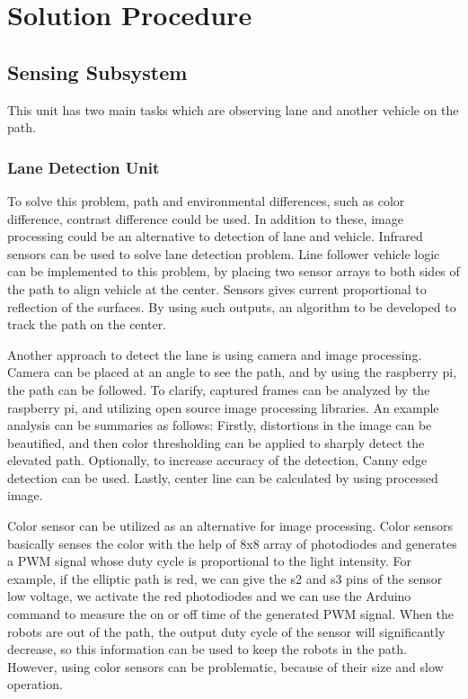 \documentclass[a4paper,12pt]{article}
\begin{document}
\section{Solution Procedure}
\subsection{Sensing Subsystem}
This unit has two main tasks which are observing lane and another vehicle on the path. 
\subsubsection{Lane Detection Unit}
To solve this problem, path and environmental differences, such as color difference, contrast difference could be used. In addition to these, image processing could be an alternative to detection of lane and vehicle. 
Infrared sensors can be used to solve lane detection problem. Line follower vehicle logic can be implemented to this problem, by placing two sensor arrays to both sides of the path to align vehicle at the center. Sensors gives current proportional to reflection of the surfaces. By using such outputs, an algorithm to be developed to track the path on the center. 

Another approach to detect the lane is using camera and image processing. Camera can be placed at an angle to see the path, and by using the raspberry pi, the path can be followed. To clarify, captured frames can be analyzed by the raspberry pi, and utilizing open source image processing libraries. An example analysis can be summaries as follows: Firstly, distortions in the image can be beautified, and then color thresholding can be applied to sharply detect the elevated path. Optionally, to increase accuracy of the detection, Canny edge detection can be used. Lastly, center line can be calculated by using processed image. 

Color sensor can be utilized as an alternative for image processing. Color sensors basically senses the color with the help of 8x8 array of photodiodes and generates a PWM signal whose duty cycle is proportional to the light intensity. For example, if the elliptic path is red, we can give the s2 and s3 pins of the sensor low voltage, we activate the red photodiodes and we can use the Arduino command to measure the on or off time of the generated PWM signal. When the robots are out of the path, the output duty cycle of the sensor will significantly decrease, so this information can be used to keep the robots in the path. However, using color sensors can be problematic, because of their size and slow operation.
\end{document}

